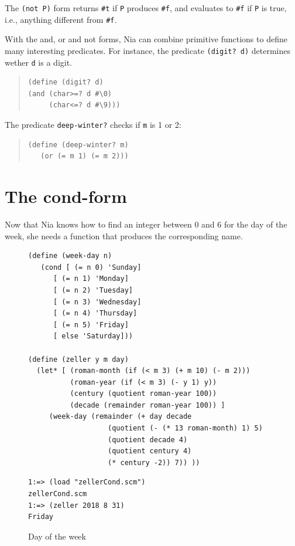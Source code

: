 \documentclass[a4paper,12pt]{book}
\newenvironment{fmpage}[1]
           {\begin{lrbox}{\fmbox}\begin{minipage}{#1}}
           {\end{minipage}\end{lrbox}\fbox{\usebox{\fmbox}}}
\begin{document}
The \verb|(not P)| form returns \verb|#t|
if \verb|P| produces \verb|#f|, and
evaluates to \verb|#f| if \verb|P| is true,
i.e., anything different from \verb|#f|.

With the and, or and not forms, Nia can
combine primitive functions to define
many interesting predicates. For instance,
the predicate \verb|(digit? d)| determines
wether \verb|d| is a digit.
\begin{quote}
\begin{verbatim}
(define (digit? d)
(and (char>=? d #\0)
     (char<=? d #\9)))
\end{verbatim}
\end{quote}
The predicate \verb|deep-winter?| checks if
\verb|m| is 1 or 2:
\begin{quote}
\begin{verbatim}
(define (deep-winter? m)
   (or (= m 1) (= m 2)))
\end{verbatim}
\end{quote}


\section{The cond-form}\label{page:cond-form}
Now that Nia knows how to find
an integer between 0 and 6 for the 
day of the week, she needs a function
that produces the corresponding name.


\begin{figure}[!h]
\begin{fmpage}{\linewidth}
\begin{verbatim}
(define (week-day n)
   (cond [ (= n 0) 'Sunday]
      [ (= n 1) 'Monday]
      [ (= n 2) 'Tuesday]
      [ (= n 3) 'Wednesday]
      [ (= n 4) 'Thursday]
      [ (= n 5) 'Friday]
      [ else 'Saturday]))

(define (zeller y m day)
  (let* [ (roman-month (if (< m 3) (+ m 10) (- m 2)))
          (roman-year (if (< m 3) (- y 1) y))
          (century (quotient roman-year 100))
          (decade (remainder roman-year 100)) ]
     (week-day (remainder (+ day decade
                   (quotient (- (* 13 roman-month) 1) 5)
                   (quotient decade 4)
                   (quotient century 4)
                   (* century -2)) 7)) ))
\end{verbatim}
\end{fmpage}

\begin{fmpage}{\linewidth}
\begin{verbatim}
1:=> (load "zellerCond.scm")
zellerCond.scm
1:=> (zeller 2018 8 31)
Friday
\end{verbatim}
\end{fmpage}
\caption{Day of the week}
\label{fig:day-of-the-week}
\end{figure}
\end{document}
